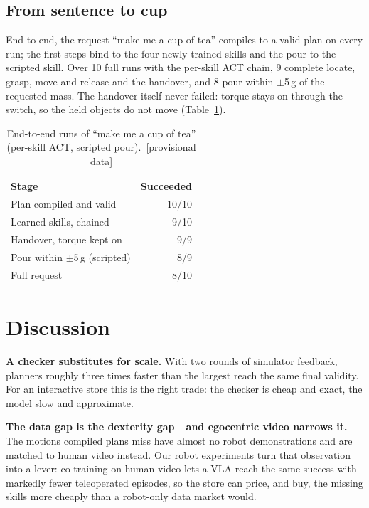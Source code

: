 \documentclass[10pt,twocolumn,letterpaper]{article}
\newif\ifprovisional \provisionaltrue
\newcommand{\prov}[1]{\ifprovisional\textcolor{prov}{#1}\else#1\fi}
\newcommand{\provtag}{\ifprovisional\ \textcolor{prov}{[provisional data]}\fi}
\begin{document}
\subsection{From sentence to cup}
End to end, the request ``make me a cup of tea'' compiles to a valid plan on every run; the first steps bind to the
four newly trained skills and the pour to the scripted skill. Over \prov{10} full runs with the per-skill ACT chain,
\prov{9} complete locate, grasp, move and release and the handover, and \prov{8} pour within \prov{$\pm$5\,g} of the
requested mass. The handover
itself never failed: torque stays on through the switch, so the held objects do not move (Table~\ref{tab:e2e}).

\begin{table}[t]
\centering\small
\caption{End-to-end runs of ``make me a cup of tea'' (per-skill ACT, scripted pour).\provtag}
\label{tab:e2e}
\begin{tabular}{@{}lr@{}}
\toprule
Stage & Succeeded\\
\midrule
Plan compiled and valid & \prov{10/10}\\
Learned skills, chained & \prov{9/10}\\
Handover, torque kept on & \prov{9/9}\\
Pour within $\pm$5\,g (scripted) & \prov{8/9}\\
\midrule
Full request & \prov{8/10}\\
\bottomrule
\end{tabular}
\end{table}

\section{Discussion}
\textbf{A checker substitutes for scale.} With two rounds of simulator feedback, planners roughly three times faster than
the largest reach the same final validity. For an interactive store this is the right trade: the checker is cheap and
exact, the model slow and approximate.

\textbf{The data gap is the dexterity gap---and egocentric video narrows it.} The motions compiled plans miss have
almost no robot demonstrations and are matched to human video instead. Our robot experiments turn that observation into
a lever: co-training on human video lets a VLA reach the same success with markedly fewer teleoperated episodes, so the
store can price, and buy, the missing skills more cheaply than a robot-only data market would.
\end{document}
